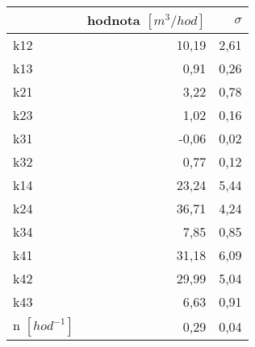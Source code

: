\begin{tabular}{lrr}
\toprule
{} &  hodnota $\left[\si{m^3/hod}\right]$ &  $\sigma$ \\
\midrule
k12                 &                                10,19 &      2,61 \\
k13                 &                                 0,91 &      0,26 \\
k21                 &                                 3,22 &      0,78 \\
k23                 &                                 1,02 &      0,16 \\
k31                 &                                -0,06 &      0,02 \\
k32                 &                                 0,77 &      0,12 \\
k14                 &                                23,24 &      5,44 \\
k24                 &                                36,71 &      4,24 \\
k34                 &                                 7,85 &      0,85 \\
k41                 &                                31,18 &      6,09 \\
k42                 &                                29,99 &      5,04 \\
k43                 &                                 6,63 &      0,91 \\
n $[\si{hod^{-1}}]$ &                                 0,29 &      0,04 \\
\bottomrule
\end{tabular}
